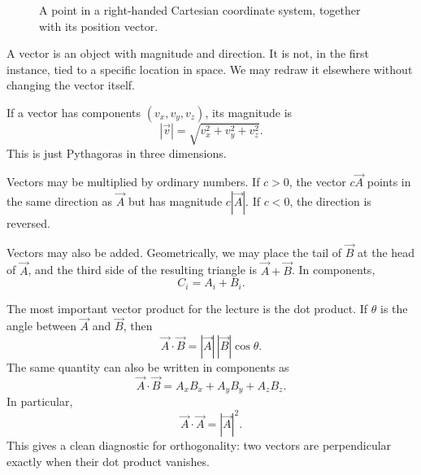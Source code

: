 \begin{figure}
\centering
{}
\caption{A point in a right-handed Cartesian coordinate system, together with its position vector.}
\end{figure}

A vector is an object with magnitude and direction. It is not, in the first instance, tied to a specific location in space. We may redraw it elsewhere without changing the vector itself.

If a vector has components \((v_x,v_y,v_z)\), its magnitude is
\begin{equation}
|\vec v|=\sqrt{v_x^2+v_y^2+v_z^2}.
\end{equation}
This is just Pythagoras in three dimensions.

Vectors may be multiplied by ordinary numbers. If \(c>0\), the vector \(c\vec A\) points in the same direction as \(\vec A\) but has magnitude \(c|\vec A|\). If \(c<0\), the direction is reversed.

Vectors may also be added. Geometrically, we may place the tail of \(\vec B\) at the head of \(\vec A\), and the third side of the resulting triangle is \(\vec A+\vec B\). In components,
\begin{equation}
C_i=A_i+B_i.
\end{equation}

The most important vector product for the lecture is the dot product. If \(\theta\) is the angle between \(\vec A\) and \(\vec B\), then
\begin{equation}
\vec A\cdot \vec B = |\vec A|\,|\vec B|\cos\theta.
\end{equation}
The same quantity can also be written in components as
\begin{equation}
\vec A\cdot \vec B=A_xB_x+A_yB_y+A_zB_z.
\end{equation}
In particular,
\begin{equation}
\vec A\cdot \vec A=|\vec A|^2.
\end{equation}
This gives a clean diagnostic for orthogonality: two vectors are perpendicular exactly when their dot product vanishes.

